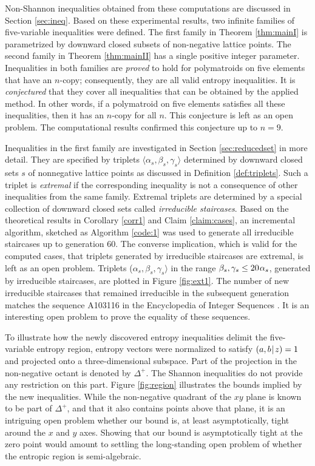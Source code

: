 \documentclass[reqno]{amsart}
\theoremstyle{definition}
\newcommand\tsp{\mkern 1.5mu}
\def\|{\mkern1.5mu{|}\mkern1.5mu}
\def\<{\langle}\def\>{\rangle}
\begin{document}
Non-Shannon inequalities obtained from these computations are discussed in
Section \ref{sec:ineq}. Based on these experimental results, two infinite
families of five-variable inequalities were defined. The first family in
Theorem \ref{thm:mainI} is parametrized by downward closed subsets of
non-negative lattice points. The second family in Theorem \ref{thm:mainII}
has a single positive integer parameter. Inequalities in both families are
\emph{proved} to hold for polymatroids on five elements that have an
$n$-copy; consequently, they are all valid entropy inequalities. It is
\emph{conjectured} that they cover all inequalities that can be obtained by
the applied method. In other words, if a polymatroid on five elements
satisfies all these inequalities, then it has an $n$-copy for all $n$. This
conjecture is left as an open problem. The computational results confirmed
this conjecture up to $n=9$.

Inequalities in the first family are investigated in Section
\ref{sec:reducedset} in more detail. They are specified by triplets
$\<\alpha_s,\beta_s,\gamma_s\>$ determined by downward closed sets $s$ of
nonnegative lattice points as discussed in Definition \ref{def:triplets}.
Such a triplet is \emph{extremal} if the corresponding inequality is not a
consequence of other inequalities from the same family. Extremal triplets
are determined by a special collection of downward closed sets called
\emph{irreducible staircases}. Based on the theoretical results in Corollary
\ref{corr1} and Claim \ref{claim:cases}, an incremental algorithm, sketched
as Algorithm \ref{code:1} was used to generate all irreducible staircases up
to generation $60$. The converse implication, which is valid for the
computed cases, that triplets generated by irreducible staircases are
extremal, is left as an open problem. Triplets
($\alpha_s,\beta_s,\gamma_s\>$ in the range $\beta_s,\gamma_s\le
20\tsp\alpha_s$, generated by irreducible staircases, are plotted in Figure
\ref{fig:ext1}. The number of new irreducible staircases that remained
irreducible in the subsequent generation matches the sequence A103116 in the
Encyclopedia of Integer Sequences \cite{oeis}. It is an interesting open
problem to prove the equality of these sequences.

To illustrate how the newly discovered entropy inequalities delimit the
five-variable entropy region, entropy vectors were normalized to satisfy
$(a,b\|z)=1$ and projected onto a three-dimensional subspace. Part of the
projection in the non-negative octant is denoted by $\Delta^+$. The Shannon
inequalities do not provide any restriction on this part. Figure
\ref{fig:region} illustrates the bounds implied by the new inequalities.
While the non-negative quadrant of the $xy$ plane is known to be part of
$\Delta^+$, and that it also contains points above that plane, it is an
intriguing open problem whether our bound is, at least asymptotically, tight
around the $x$ and $y$ axes. Showing that our bound is asymptotically tight
at the zero point would amount to settling the long-standing open problem of
whether the entropic region is semi-algebraic.
\end{document}
